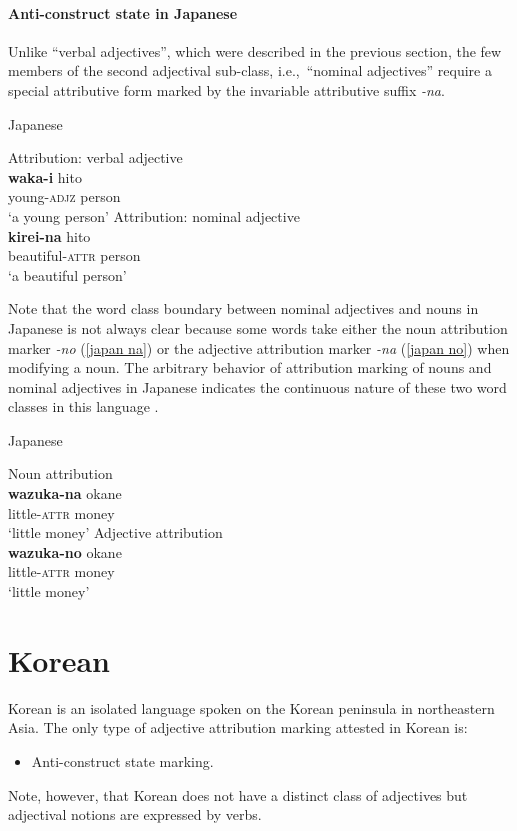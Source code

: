 \paragraph*{Anti\hyp{}construct state in Japanese}
Unlike “verbal adjectives”, which were described in the previous section, the few members of the second adjectival sub-class, i.e.,~“nominal adjectives” require a special attributive form marked by the invariable attributive suffix \textit{-na}.
\begin{exe}
\ex \rm{Japanese \citep[72–81]{pustet1989}}%
\begin{xlist}
\ex \rm{Attribution: verbal adjective}\\
\gll	\textbf{waka-i} hito\\
	young-\textsc{adjz} person\\
\glt	‘a young person’
\ex \rm{Attribution: nominal adjective}\\
\gll	\textbf{kirei-na} hito\\
	beautiful-\textsc{attr} person\\
\glt	‘a beautiful person’
\end{xlist}
\end{exe}
Note that the word class boundary between nominal adjectives and nouns in Japanese is not always clear because some words take either the noun attribution marker \textit{-no} (\ref{japan na}) or the adjective attribution marker \textit{-na} (\ref{japan no}) when modifying a noun. The arbitrary behavior of attribution marking of nouns and nominal adjectives in Japanese indicates the continuous nature of these two word classes in this language \citep[79–80]{pustet1989}.
\begin{exe}
\ex \rm{Japanese \citep[72–81]{pustet1989}}%
\begin{xlist}
\ex \rm{Noun attribution}\\ \label{japan na}
\gll	\textbf{wazuka-na} okane\\
	little-\textsc{attr} money\\
\glt	‘little money’
\ex \rm{Adjective attribution}\\ \label{japan no}
\gll	\textbf{wazuka-no} okane\\
	little-\textsc{attr} money\\
\glt	‘little money’
\end{xlist}
\end{exe}

\section{Korean}
Korean is an isolated language spoken on the Korean peninsula in northeastern Asia. The only type of adjective attribution marking attested in Korean is:
\begin{itemize}
\item Anti\hyp{}construct state marking.
\end{itemize}
Note, however, that Korean does not have a distinct class of adjectives but adjectival notions are expressed by verbs.

